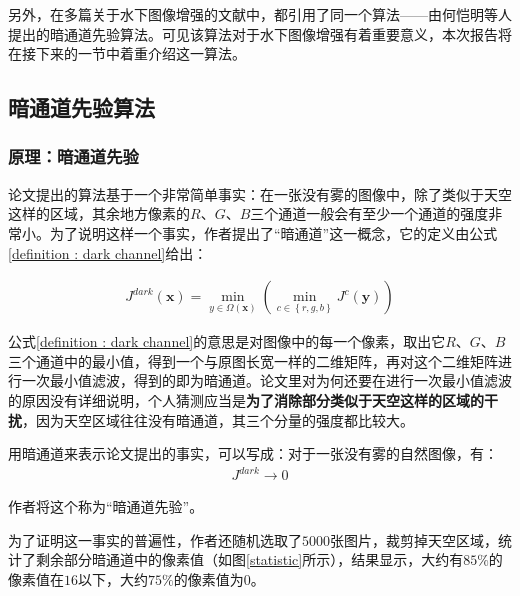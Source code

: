\documentclass[UTF8]{ctexart}
\begin{document}
            \indent 另外，在多篇关于水下图像增强的文献中\cite{lin2020水下图像处理技术}\cite{lin2020基于优势特征图像融合的水下光学图像增强}\cite{zou2020非均匀光照}，都引用了同一个算法——由何恺明等人提出的暗通道先验算法\cite{he2010single}。可见该算法对于水下图像增强有着重要意义，本次报告将在接下来的一节中着重介绍这一算法。
            
        \subsection{暗通道先验算法}
            \subsubsection{原理：暗通道先验}\label{principle : dark channel prior}
                \indent 论文提出的算法基于一个非常简单事实：在一张没有雾的图像中，除了类似于天空这样的区域，其余地方像素的$R$、$G$、$B$三个通道一般会有至少一个通道的强度非常小。为了说明这样一个事实，作者提出了“暗通道”这一概念，它的定义由公式\ref{definition : dark channel}给出：
                
                    \begin{align}
                        J^{dark} \left( \mathbf{x} \right) = \mathop{min}\limits_{ y \in \Omega \left( \mathbf{x} \right)} \left( \mathop{min}\limits_{c \in \left\{ r, g, b \right\}  }  J^c \left( \mathbf{y} \right)    \right)  \label{definition : dark channel}
                    \end{align}
                    
                \indent 公式\ref{definition : dark channel}的意思是对图像中的每一个像素，取出它$R$、$G$、$B$三个通道中的最小值，得到一个与原图长宽一样的二维矩阵，再对这个二维矩阵进行一次最小值滤波，得到的即为暗通道。论文里对为何还要在进行一次最小值滤波的原因没有详细说明，个人猜测应当是\textbf{为了消除部分类似于天空这样的区域的干扰}，因为天空区域往往没有暗通道，其三个分量的强度都比较大。
                
                \indent 用暗通道来表示论文提出的事实，可以写成：对于一张没有雾的自然图像，有：
                    \begin{align}
                        J^{dark} \rightarrow 0 \label{dark channel : tend to be 0}
                    \end{align}
                    
                \indent 作者将这个称为“暗通道先验”。
                
                \indent 为了证明这一事实的普遍性，作者还随机选取了$5000$张图片，裁剪掉天空区域，统计了剩余部分暗通道中的像素值（如图\ref{statistic}所示），结果显示，大约有$85\%$的像素值在$16$以下，大约$75\%$的像素值为$0$。
    			
\end{document}
